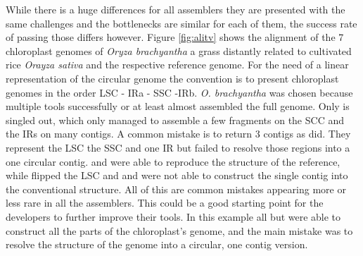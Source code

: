 While there is a huge differences for all assemblers they are presented with the same challenges and the
bottlenecks are similar for each of them, the success rate of passing those differs however. Figure
\ref{fig:alitv} shows the alignment of the 7 chloroplast genomes of \textit{Oryza brachyantha} a grass
distantly related to cultivated rice \textit{Orayza sativa} and the respective reference genome. For the need
of a linear representation of the circular genome the convention is to present chloroplast genomes in the
order LSC - IRa - SSC -IRb. \textit{O. brachyantha} was chosen because multiple tools successfully or at least
almost assembled the full genome. Only \cassp is singled out, which only managed to assemble a few fragments
on the SCC and the IRs on many contigs. A common mistake is to return 3 contigs as \ioga \hspace{.5ex}
did. They represent the LSC the SSC and one IR but failed to resolve those regions into a one circular
contig. \go \hspace{.5ex} and \fp \hspace{.5ex} were able to reproduce the structure of the reference, while
\ce \hspace{.5ex} flipped the LSC and \np  and \oa \hspace{.5ex} were not able to construct the single contig
into the conventional structure. All of this are common mistakes appearing more or less rare in all the
assemblers. This could be a good starting point for the developers to further improve their tools. In this
example all but \cassp \hspace{.5ex} were able to construct all the parts of the chloroplast's genome, and the
main mistake was to resolve the structure of the genome into a circular, one contig version.



